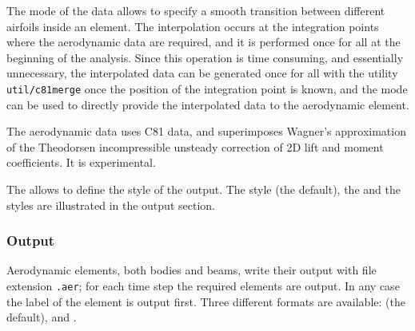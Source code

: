 The  mode of the  data allows to specify 
a smooth transition between different airfoils inside an element.
The interpolation occurs at the integration points where the
aerodynamic data are required, and it is performed once for all
at the beginning of the analysis.
Since this operation is time consuming, and essentially unnecessary,
the interpolated data can be generated once for all with the utility
\texttt{util/c81merge} once the position of the integration point is known,
and the  mode can be used to directly provide
the interpolated data to the aerodynamic element.

The  aerodynamic data uses C81 data,
and superimposes Wagner's approximation of the Theodorsen incompressible
unsteady correction of 2D lift and moment coefficients.
It is experimental.

The  allows to define the style of the output.
The  style (the default), the  and the 
styles are illustrated in the output section.


\subsubsection{Output}
Aerodynamic elements, both bodies and beams, write their output with file
extension \texttt{.aer}; for each time step the required elements are output.
In any case the label of the element is output first.
Three different formats are available:  (the default),
 and .

